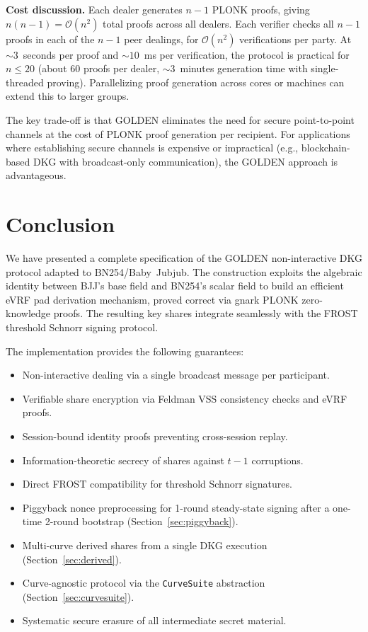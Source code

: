 \documentclass[11pt,a4paper]{article}
\newcommand{\bigO}{\mathcal{O}}
\begin{document}
\medskip
\noindent\textbf{Cost discussion.}
Each dealer generates $n - 1$ PLONK proofs, giving $n(n - 1) = \bigO(n^2)$
total proofs across all dealers. Each verifier checks all $n - 1$ proofs in
each of the $n - 1$ peer dealings, for $\bigO(n^2)$ verifications per party.
At ${\sim}3$~seconds per proof and ${\sim}10$~ms per verification, the protocol
is practical for $n \le 20$ (about 60 proofs per dealer, ${\sim}3$~minutes
generation time with single-threaded proving). Parallelizing proof generation
across cores or machines can extend this to larger groups.

The key trade-off is that GOLDEN eliminates the need for secure point-to-point
channels at the cost of PLONK proof generation per recipient. For applications
where establishing secure channels is expensive or impractical (e.g.,
blockchain-based DKG with broadcast-only communication), the GOLDEN approach is
advantageous.

\section{Conclusion}
\label{sec:conclusion}

We have presented a complete specification of the GOLDEN non-interactive DKG
protocol adapted to BN254/Baby~Jubjub. The construction exploits the algebraic
identity between BJJ's base field and BN254's scalar field to build an
efficient eVRF pad derivation mechanism, proved correct via gnark PLONK
zero-knowledge proofs. The resulting key shares integrate seamlessly with the
FROST threshold Schnorr signing protocol.

The implementation provides the following guarantees:
\begin{itemize}[nosep]
  \item Non-interactive dealing via a single broadcast message per participant.
  \item Verifiable share encryption via Feldman VSS consistency checks and eVRF proofs.
  \item Session-bound identity proofs preventing cross-session replay.
  \item Information-theoretic secrecy of shares against $t-1$ corruptions.
  \item Direct FROST compatibility for threshold Schnorr signatures.
  \item Piggyback nonce preprocessing for 1-round steady-state signing after a one-time 2-round bootstrap (Section~\ref{sec:piggyback}).
  \item Multi-curve derived shares from a single DKG execution (Section~\ref{sec:derived}).
  \item Curve-agnostic protocol via the \texttt{CurveSuite} abstraction (Section~\ref{sec:curvesuite}).
  \item Systematic secure erasure of all intermediate secret material.
\end{itemize}
\end{document}
